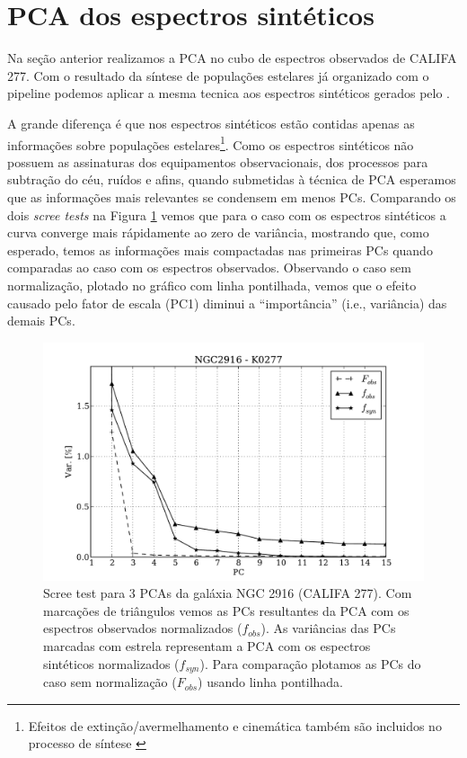 \section{PCA dos espectros sintéticos}
\label{sec:PCAaplic:OBSxSYN}

Na seção anterior realizamos a PCA no cubo de espectros observados de CALIFA 277. Com o resultado da síntese de
populações estelares já organizado com o pipeline \pycasso podemos aplicar a mesma tecnica aos espectros sintéticos
gerados pelo \starlight.

A grande diferença é que nos espectros sintéticos estão contidas apenas as informações sobre populações
estelares\footnote{Efeitos de extinção/avermelhamento e cinemática também são incluidos no processo de síntese
\citep{CidFernandes2005}}. Como os espectros sintéticos não possuem as assinaturas dos equipamentos observacionais, dos
processos para subtração do céu, ruídos e afins, quando submetidas à técnica de PCA esperamos que as informações mais
relevantes se condensem em menos PCs. Comparando os dois {\em scree tests} na Figura \ref{fig:K0277scree} vemos que para
o caso com os espectros sintéticos a curva converge mais rápidamente ao zero de variância, mostrando que, como esperado,
temos as informações mais compactadas nas primeiras PCs quando comparadas ao caso com os espectros observados.
Observando o caso sem normalização, plotado no gráfico com linha pontilhada, vemos que o efeito causado pelo fator de
escala (PC1) diminui a ``importância'' (i.e., variância) das demais PCs.

\begin{figure}
    \includegraphics[width=1.\textwidth]{figuras/K0277-screetest.pdf}
    \caption[Scree test comparativo entre 3 PCAs.]
    {Scree test para 3 PCAs da galáxia NGC 2916 (CALIFA 277). Com marcações de triângulos vemos as PCs resultantes
    da PCA com os espectros observados normalizados ($f_{obs}$). As variâncias das PCs marcadas com estrela
    representam a PCA com os espectros sintéticos normalizados ($f_{syn}$). Para comparação plotamos as PCs do
    caso sem normalização ($F_{obs}$) usando linha pontilhada.}
    \label{fig:K0277scree}
\end{figure}

